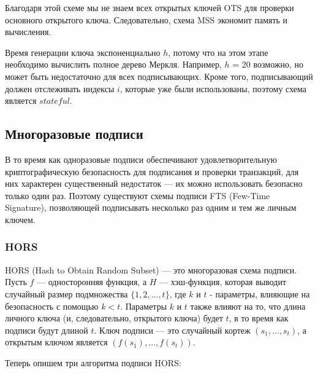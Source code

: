 \documentclass[a4paper, 14pt]{extarticle}
\begin{document}
Благодаря этой схеме мы не знаем всех открытых ключей OTS для проверки основного открытого ключа. Следовательно, схема MSS экономит память и вычисления.

Время генерации ключа экспоненциально $h$, потому что на этом этапе необходимо вычислить полное дерево Меркля. Например, $h$ = 20 возможно, но может быть недостаточно для всех подписывающих. Кроме того, подписывающий должен отслеживать индексы $i$, которые уже были использованы, поэтому схема является $stateful$.

\subsection{Многоразовые подписи}
\label{fts}
В то время как одноразовые подписи обеспечивают удовлетворительную криптографическую безопасность для подписания и проверки транзакций, для них характерен существенный недостаток --- их можно использовать безопасно только один раз. Поэтому существуют схемы подписи FTS (Few-Time Signature), позволяющей подписывать несколько раз одним и тем же личным ключем.
\subsubsection{HORS}
HORS (Hash to Obtain Random Subset) --- это многоразовая схема подписи. Пусть $f$ --- односторонняя функция, а $H$ --- хэш-функция, которая выводит случайный размер подмножества $\{1,2,...,t\}$, где $k$ и $t$ - параметры, влияющие на безопасность с помощью $k < t$. Параметры $k$ и $t$ также влияют на то, что длина личного ключа (и, следовательно, открытого ключа) будет $t$, в то время как подписи будут длиной $t$. Ключ подписи --- это случайный кортеж $(s_1,...,s_t)$, а открытым ключом является $(f(s_{1}),..., f(s_{t}))$.
\newline

Теперь опишем три алгоритма подписи HORS:
\end{document}
